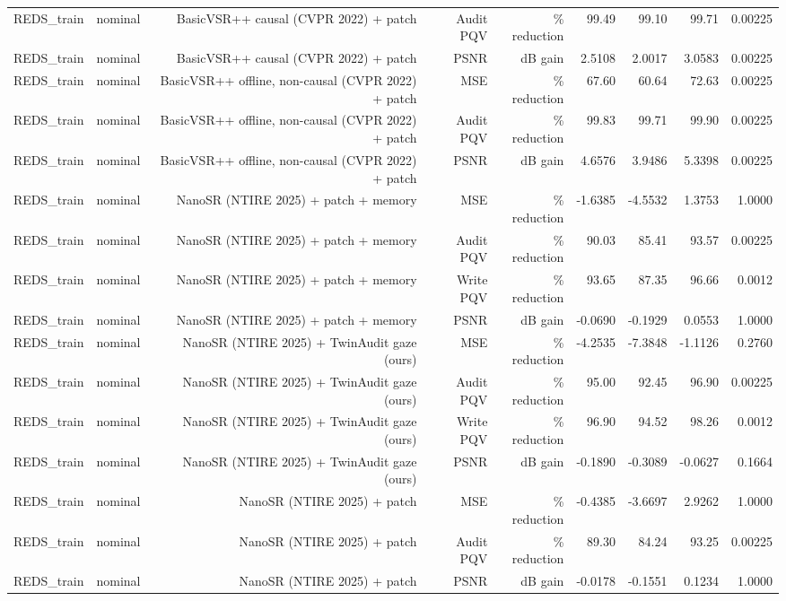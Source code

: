 \begin{table}[t]
\begin{tabular}{llrrrrrrr}
REDS\_train & nominal & BasicVSR++ causal (CVPR 2022) + patch & Audit PQV & \% reduction & 99.49 & 99.10 & 99.71 & 0.00225 \\
REDS\_train & nominal & BasicVSR++ causal (CVPR 2022) + patch & PSNR & dB gain & 2.5108 & 2.0017 & 3.0583 & 0.00225 \\
REDS\_train & nominal & BasicVSR++ offline, non-causal (CVPR 2022) + patch & MSE & \% reduction & 67.60 & 60.64 & 72.63 & 0.00225 \\
REDS\_train & nominal & BasicVSR++ offline, non-causal (CVPR 2022) + patch & Audit PQV & \% reduction & 99.83 & 99.71 & 99.90 & 0.00225 \\
REDS\_train & nominal & BasicVSR++ offline, non-causal (CVPR 2022) + patch & PSNR & dB gain & 4.6576 & 3.9486 & 5.3398 & 0.00225 \\
REDS\_train & nominal & NanoSR (NTIRE 2025) + patch + memory & MSE & \% reduction & -1.6385 & -4.5532 & 1.3753 & 1.0000 \\
REDS\_train & nominal & NanoSR (NTIRE 2025) + patch + memory & Audit PQV & \% reduction & 90.03 & 85.41 & 93.57 & 0.00225 \\
REDS\_train & nominal & NanoSR (NTIRE 2025) + patch + memory & Write PQV & \% reduction & 93.65 & 87.35 & 96.66 & 0.0012 \\
REDS\_train & nominal & NanoSR (NTIRE 2025) + patch + memory & PSNR & dB gain & -0.0690 & -0.1929 & 0.0553 & 1.0000 \\
REDS\_train & nominal & NanoSR (NTIRE 2025) + TwinAudit gaze (ours) & MSE & \% reduction & -4.2535 & -7.3848 & -1.1126 & 0.2760 \\
REDS\_train & nominal & NanoSR (NTIRE 2025) + TwinAudit gaze (ours) & Audit PQV & \% reduction & 95.00 & 92.45 & 96.90 & 0.00225 \\
REDS\_train & nominal & NanoSR (NTIRE 2025) + TwinAudit gaze (ours) & Write PQV & \% reduction & 96.90 & 94.52 & 98.26 & 0.0012 \\
REDS\_train & nominal & NanoSR (NTIRE 2025) + TwinAudit gaze (ours) & PSNR & dB gain & -0.1890 & -0.3089 & -0.0627 & 0.1664 \\
REDS\_train & nominal & NanoSR (NTIRE 2025) + patch & MSE & \% reduction & -0.4385 & -3.6697 & 2.9262 & 1.0000 \\
REDS\_train & nominal & NanoSR (NTIRE 2025) + patch & Audit PQV & \% reduction & 89.30 & 84.24 & 93.25 & 0.00225 \\
REDS\_train & nominal & NanoSR (NTIRE 2025) + patch & PSNR & dB gain & -0.0178 & -0.1551 & 0.1234 & 1.0000 \\

\end{tabular}
\end{table}
